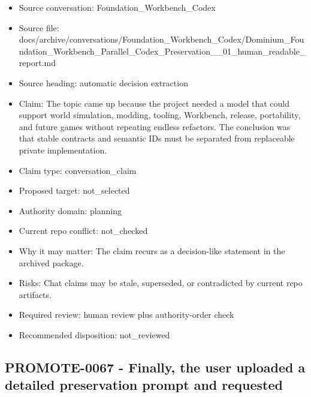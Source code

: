 \documentclass[11pt,a4paper]{report}
\begin{document}
\begin{itemize}
\item Source conversation: Foundation\_Workbench\_Codex
\item Source file: docs/archive/conversations/Foundation\_Workbench\_Codex/Dominium\_Foundation\_Workbench\_Parallel\_Codex\_Preservation\_\_01\_human\_readable\_report.md
\item Source heading: automatic decision extraction
\item Claim: The topic came up because the project needed a model that could support world simulation, modding, tooling, Workbench, release, portability, and future games without repeating endless refactors. The conclusion was that stable contracts and semantic IDs must be separated from replaceable private implementation.
\item Claim type: conversation\_claim
\item Proposed target: not\_selected
\item Authority domain: planning
\item Current repo conflict: not\_checked
\item Why it may matter: The claim recurs as a decision-like statement in the archived package.
\item Risks: Chat claims may be stale, superseded, or contradicted by current repo artifacts.
\item Required review: human review plus authority-order check
\item Recommended disposition: not\_reviewed
\end{itemize}

\subsection{PROMOTE-0067 - Finally, the user uploaded a detailed preservation prompt and requested}
\end{document}
